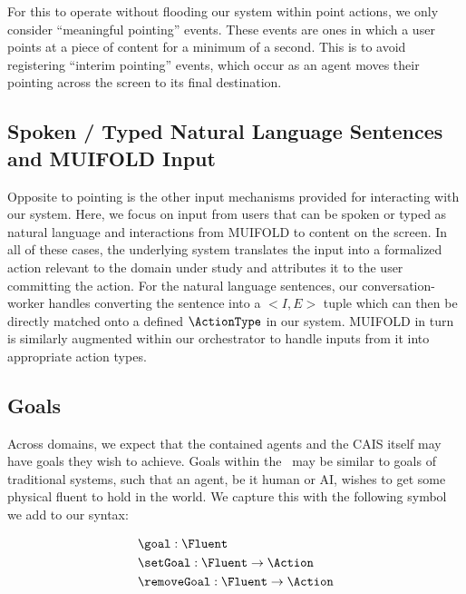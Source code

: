 For this to operate without flooding our system within point actions, we only consider
``meaningful pointing'' events. These events are ones in which a user points at a piece
of content for a minimum of a second. This is to avoid registering ``interim pointing''
events, which occur as an agent moves their pointing across the screen to its final
destination.

\subsection{Spoken / Typed Natural Language Sentences and MUIFOLD Input}

Opposite to pointing is the other input mechanisms provided for interacting with our system.
Here, we focus on input from users that can be spoken or typed as natural language and
interactions from MUIFOLD to content on the screen. In all of these cases, the underlying
system translates the input into a formalized action relevant to the domain under study
and attributes it to the user committing the action. For the natural language sentences,
our conversation-worker handles converting the sentence into a $<I, E>$ tuple which
can then be directly matched onto a defined $\ActionType$ in our system. MUIFOLD in turn is
similarly augmented within our orchestrator to handle inputs from it into appropriate action
types.

\subsection{Goals}

Across domains, we expect that the contained agents and the CAIS itself may have goals they
wish to achieve. Goals within the \CEC\ may be similar to goals of traditional systems, such
that an agent, be it human or AI, wishes to get some physical fluent to hold in the world.
We capture this with the following symbol we add to our syntax:

\begin{equation*}
    \begin{aligned}
    & \goal: \Fluent \\
    & \setGoal: \Fluent \rightarrow \Action \\
    & \removeGoal: \Fluent \rightarrow \Action \\
    \end{aligned}
\end{equation*}